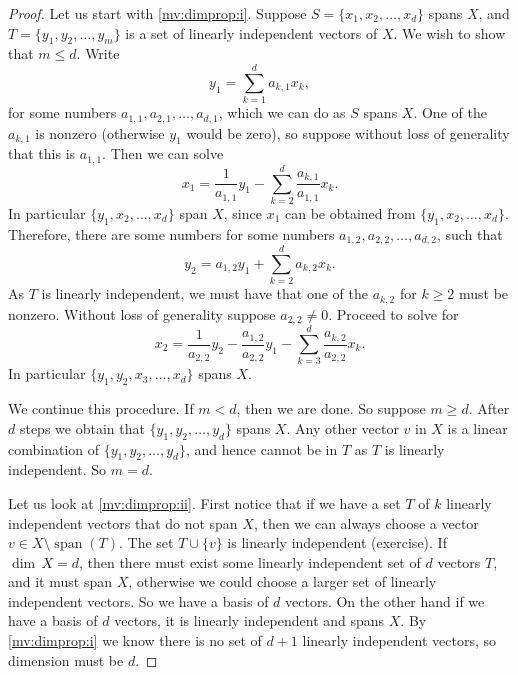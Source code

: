 \documentclass[12pt]{book}
\newcommand{\spn}{\operatorname{span}}
\theoremstyle{plain}
\theoremstyle{remark}
\theoremstyle{definition}
\theoremstyle{exercise}
\theoremstyle{example}
\begin{document}
\begin{proof}
Let us start with \ref{mv:dimprop:i}.
Suppose $S = \{ x_1 , x_2, \ldots, x_d \}$ spans $X$, and
$T = \{ y_1, y_2, \ldots, y_m \}$ is a set of linearly independent
vectors of $X$.  We wish to show that $m \leq d$.
Write
\begin{equation*}
y_1 = \sum_{k=1}^d a_{k,1} x_k ,
\end{equation*}
for some numbers $a_{1,1},a_{2,1},\ldots,a_{d,1}$,
which we can do as $S$ spans $X$.  One of the
$a_{k,1}$ is nonzero (otherwise $y_1$ would be zero),
so suppose without loss of generality that this
is $a_{1,1}$.  Then we can solve
\begin{equation*}
x_1 = \frac{1}{a_{1,1}} y_1 - \sum_{k=2}^d \frac{a_{k,1}}{a_{1,1}} x_k .
\end{equation*}
In particular $\{ y_1 , x_2, \ldots, x_d \}$ span $X$, since $x_1$ can be
obtained from $\{ y_1 , x_2, \ldots, x_d \}$.  Therefore, there are some numbers
for some numbers $a_{1,2},a_{2,2},\ldots,a_{d,2}$, such that
\begin{equation*}
y_2 = a_{1,2} y_1 + \sum_{k=2}^d a_{k,2} x_k .
\end{equation*}
As $T$ is linearly independent, we must have that one of the $a_{k,2}$
for $k \geq 2$ must be nonzero.  Without loss of generality suppose 
$a_{2,2} \not= 0$.  Proceed to solve for 
\begin{equation*}
x_2 = \frac{1}{a_{2,2}} y_2 - \frac{a_{1,2}}{a_{2,2}} y_1 - \sum_{k=3}^d
\frac{a_{k,2}}{a_{2,2}} x_k .
\end{equation*}
In particular 
$\{ y_1 , y_2, x_3, \ldots, x_d \}$ spans $X$.

We continue this procedure.  If $m < d$, then we are done.  So suppose
$m \geq d$.
After $d$ steps we obtain that 
$\{ y_1 , y_2, \ldots, y_d \}$ spans $X$.  Any
other vector $v$ in $X$ is a linear combination of
$\{ y_1 , y_2, \ldots, y_d \}$, and hence cannot be in $T$ as $T$ is
linearly independent.  So $m = d$.

Let us look at \ref{mv:dimprop:ii}.
First notice that if we have a set $T$ of $k$ linearly independent vectors
that do not span $X$, then we can always choose a vector $v \in X \setminus
\spn (T)$.  The set $T \cup \{ v \}$ is linearly independent (exercise).
If $\dim \, X = d$,
then there must exist some linearly independent set of $d$ vectors $T$,
and it must span $X$, otherwise we could choose a larger set of linearly
independent vectors.  So we have a basis of $d$ vectors.
On the other hand if we have a basis of $d$ vectors,
it is linearly independent and spans $X$.  By \ref{mv:dimprop:i} we know
there is no set of $d+1$ linearly independent vectors, so dimension must be $d$.


\end{proof}
\end{document}
